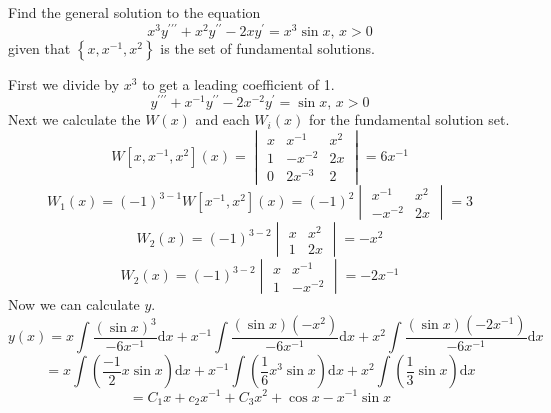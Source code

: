 \begin{example}
	Find the general solution to the equation
	\begin{equation*}
		x^3y^{\prime\prime\prime} + x^2y^{\prime\prime} - 2xy^\prime = x^3\sin{x} \text{, } x > 0
	\end{equation*}
	given that $\left\{x, x^{-1}, x^2\right\}$ is the set of fundamental solutions.
\end{example}
\noindent
First we divide by $x^3$ to get a leading coefficient of 1.
\begin{equation*}
	y^{\prime\prime\prime} + x^{-1}y^{\prime\prime} - 2x^{-2}y^\prime = \sin{x} \text{, } x > 0
\end{equation*}
Next we calculate the $W(x)$ and each $W_i(x)$ for the fundamental solution set.
\begin{equation*}
	W[x,x^{-1}, x^2](x) = \begin{vmatrix}
		x & x^{-1} & x^2 \\
		1 & -x^{-2} & 2x \\
		0 & 2x^{-3} & 2
	\end{vmatrix} = 6x^{-1}
\end{equation*}
\begin{equation*}
	W_1(x) = (-1)^{3-1}W[x^{-1}, x^2](x) = (-1)^{2}\begin{vmatrix}
		x^{-1} & x^2 \\
		-x^{-2} & 2x
	\end{vmatrix} = 3
\end{equation*}
\begin{equation*}
	W_2(x) = (-1)^{3-2}\begin{vmatrix}
		x & x^{2} \\
		1 & 2x
	\end{vmatrix} = -x^2
\end{equation*}
\begin{equation*}
	W_2(x) = (-1)^{3-2}\begin{vmatrix}
		x & x^{-1} \\
		1 & -x^{-2}
	\end{vmatrix} = -2x^{-1}
\end{equation*}
Now we can calculate $y$.
\begin{equation*}
	y(x) = x\int{\frac{(\sin{x})^3}{-6x^{-1}} \mathrm{d}x} + x^{-1}\int{\frac{(\sin{x})(-x^2)}{-6x^{-1}} \mathrm{d}x} + x^2\int{\frac{(\sin{x})(-2x^{-1})}{-6x^{-1}} \mathrm{d}x}
\end{equation*}
\begin{equation*}
	= x\int{\left(\frac{-1}{2}x\sin{x}\right)\mathrm{d}x} + x^{-1}\int{\left(\frac{1}{6}x^3\sin{x}\right)\mathrm{d}x} + x^2\int{\left(\frac{1}{3}\sin{x}\right)\mathrm{d}x}
\end{equation*}
\begin{equation*}
	= C_1x + c_2x^{-1} + C_3x^2 + \cos{x} - x^{-1}\sin{x}
\end{equation*}